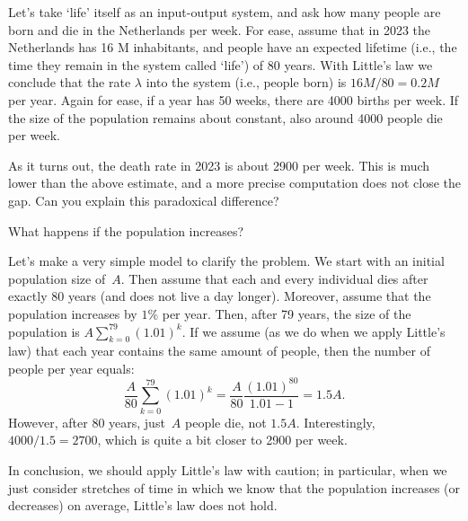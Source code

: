 \documentclass[queueing-book.tex]{subfiles}
\begin{document}
\begin{exercise}
Let's take `life' itself as an input-output system, and ask how many people are born and die in the Netherlands per week.
For ease, assume that in 2023 the Netherlands has 16 M inhabitants, and people have an expected lifetime (i.e., the time they remain in the system called `life') of 80 years.
With Little's law we conclude that the rate $\lambda$ into the system (i.e., people born) is $16 M/80 = 0.2 M $ per year.
Again for ease, if a year has 50 weeks, there are 4000 births per week.
If the size of the population remains about constant, also around 4000 people die per week.

As it turns out, the death rate in 2023 is about 2900 per week.
This is much lower than the above estimate, and a more precise computation does not close the gap.
Can you explain this paradoxical difference?

\begin{hint}
What happens if the population increases?
\end{hint}
\begin{solution}
Let's make a very simple model to clarify the problem.
We start with an initial population size of~$A$.
Then assume that each and every individual dies after exactly 80 years (and does not live a day longer).
Moreover, assume that the population increases by $1\%$ per year.
Then, after 79 years, the size of the population is $A \sum_{k=0}^{79}(1.01)^{k}$.
If we assume (as we do when we apply Little's law) that each year contains the same amount of people, then the number of people per year equals:
\begin{equation*}
\frac{A}{80}\sum_{k=0}^{79} (1.01)^k = \frac{A}{80} \frac{(1.01)^{80}}{1.01-1} = 1.5 A.
\end{equation*}
However, after 80 years, just~$A$ people die, not $1.5 A$.
Interestingly, $4000/1.5 = 2700$, which is quite a bit closer to 2900 per week.

In conclusion, we should apply Little's law with caution; in particular, when we just consider stretches of time in which we know that the population increases (or decreases) on average, Little's law does not hold.

\end{solution}
\end{exercise}
\end{document}
